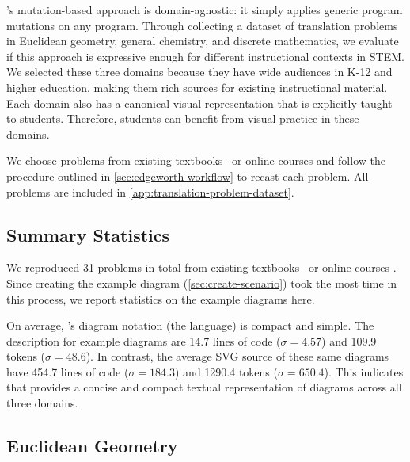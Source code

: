 \Edgeworth's mutation-based approach is domain-agnostic: it simply applies generic program mutations on any \Substance program. Through collecting a dataset of translation problems in Euclidean geometry, general chemistry, and discrete mathematics, we evaluate if this approach is expressive enough for different instructional contexts in STEM. We selected these three domains because they have wide audiences in K-12 and higher education, making them rich sources for existing instructional material. Each domain also has a canonical visual representation that is explicitly taught to students. Therefore, students can benefit from visual practice in these domains.

We choose problems from existing textbooks~\cite{rosen_discrete_1999,noauthor_holt_nodate} or online courses \cite{oli} and follow the procedure outlined in \cref{sec:edgeworth-workflow} to recast each problem. All problems are included in \cref{app:translation-problem-dataset}.

\subsection{Summary Statistics}
\label{sec:edgeworth-case-studies-summary}

We reproduced 31 problems in total from existing textbooks~\cite{rosen_discrete_1999,noauthor_holt_nodate} or online courses \cite{oli}. Since creating the example diagram (\cref{sec:create-scenario}) took the most time in this process, we report statistics on the example diagrams here. 

On average, \Edgeworth's diagram notation (\ie the \Substance language) is compact and simple. The description for example diagrams are 14.7 lines of code ($\sigma = 4.57$) and 109.9 tokens ($\sigma = 48.6$). In contrast, the average SVG source of these same diagrams have 454.7 lines of code ($\sigma = 184.3$) and 1290.4 tokens ($\sigma = 650.4$). This indicates that \Edgeworth provides a concise and compact textual representation of diagrams across all three domains.

\subsection{Euclidean Geometry}
\label{sec:edgeworth-geometry}


